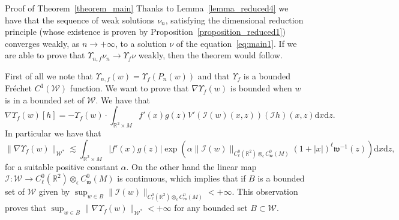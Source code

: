 \documentclass[a4paper,10pt]{article}
\newcommand{\asterisk}{\mathord{*}}
\newcommand{\mathd}{\mathrm{d}}
\newenvironment{proof*}[1]{\noindent\textbf{#1\ }}{\hspace*{\fill}$\Box$\medskip}
\begin{document}
\begin{proof*}{Proof of Theorem~\ref{theorem_main}}
  Thanks to Lemma~\ref{lemma_reduced4} we have that the sequence of weak
  solutions $\nu_n$, satisfying the dimensional reduction principle (whose
  existence is proven by Proposition~\ref{proposition_reduced1}) converges
  weakly, as $n \rightarrow + \infty$, to a solution $\nu$ of the
  equation~{\eqref{eq:main1}}. If we are able to prove that $\Upsilon_{n, f}
  \nu_n \rightarrow \Upsilon_f \nu$ weakly, then the theorem would follow.
  
  First of all we note that $\Upsilon_{n, f} (w) = \Upsilon_f (P_n (w))$ and
  that $\Upsilon_f$ is a bounded Fr{\'e}chet $C^1 (\mathcal{W})$ function. We
  want to prove that $\nabla \Upsilon_f (w)$ is bounded when $w$ is in a
  bounded set of $\mathcal{W}$. We have that
  \[ \nabla \Upsilon_f (w) [h] = - \Upsilon_f (w) \cdot \int_{\mathbb{R}^2
     \times M} f' (x) g (z) V' (\mathcal{I} (w) (x, z)) (\mathcal{I} h) (x, z)
     \mathd x \mathd z. \]
  In particular we have that
  \[ \| \nabla \Upsilon_f (w) \|_{\mathcal{W}^{\asterisk}} \lesssim
     \int_{\mathbb{R}^2 \times M} | f' (x) g (z) | \exp (\alpha \| \mathcal{I}
     (w) \|_{C^0_{\ell} (\mathbb{R}^2) \otimes_{\epsilon} C^0_{\mathfrak{w}}
     (M)} (1 + | x |)_{}^{\ell} \mathfrak{w}^{- 1} (z)) \mathd x \mathd z, \]
  for a suitable positive constant $\alpha$. On the other hand the linear map
  $\mathcal{I} : \mathcal{W} \rightarrow C^0_{\ell} (\mathbb{R}^2)
  \otimes_{\epsilon} C^0_{\mathfrak{w}} (M)$ is continuous, which implies that
  if $B$ is a bounded set of $\mathcal{W}$ given by $\sup_{w \in B} \|
  \mathcal{I} (w) \|_{C^0_{\ell} (\mathbb{R}^2) \otimes_{\epsilon}
  C^0_{\mathfrak{w}} (M)} < + \infty$. This observation proves that $\sup_{w
  \in B} \| \nabla \Upsilon_f (w) \|_{\mathcal{W}^{\asterisk}} < + \infty$ for
  any bounded set $B \subset \mathcal{W}$.
  

\end{proof*}
\end{document}

